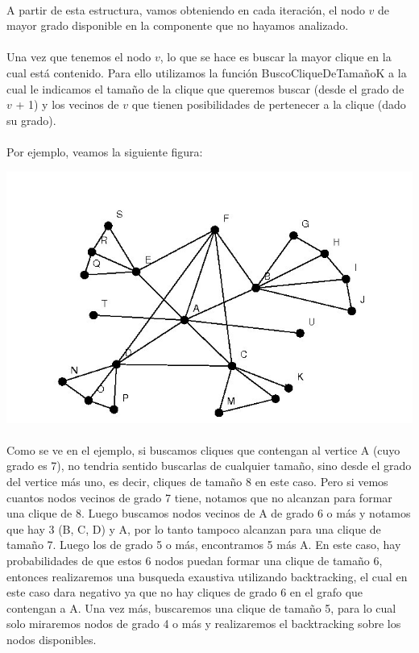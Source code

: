 \paragraph{}
A partir de esta estructura, vamos obteniendo en cada iteración, el nodo $v$ de mayor grado disponible en la componente que no hayamos analizado.

\paragraph{}
Una vez que tenemos el nodo $v$, lo que se hace es buscar la mayor clique en la cual está contenido. Para ello utilizamos la función BuscoCliqueDeTamañoK a la cual le indicamos el tamaño de la clique que queremos buscar (desde el grado de $v$ + 1) y los vecinos de $v$ que tienen posibilidades de pertenecer a la clique (dado su grado).

\paragraph{}
Por ejemplo, veamos la siguiente figura:

\includegraphics[scale = 0.9]{./p.jpg} \\

\paragraph{}
Como se ve en el ejemplo, si buscamos cliques que contengan al vertice A (cuyo grado es 7), no tendria sentido buscarlas de cualquier tamaño, sino desde el grado del vertice más uno, es decir, cliques de tamaño 8 en este caso. Pero si vemos cuantos nodos vecinos de grado 7 tiene, notamos que no alcanzan para formar una clique de 8. Luego buscamos nodos vecinos de A de grado 6 o más y notamos que hay 3 (B, C, D) y A, por lo tanto tampoco alcanzan para una clique de tamaño 7. Luego los de grado 5 o más, encontramos 5 más A. En este caso, hay probabilidades de que estos 6 nodos puedan formar una clique de tamaño 6, entonces realizaremos una busqueda exaustiva utilizando backtracking, el cual en este caso dara negativo ya que no hay cliques de grado 6 en el grafo que contengan a A. Una vez más, buscaremos una clique de tamaño 5, para lo cual solo miraremos nodos de grado 4 o más y realizaremos el backtracking sobre los nodos disponibles. 

